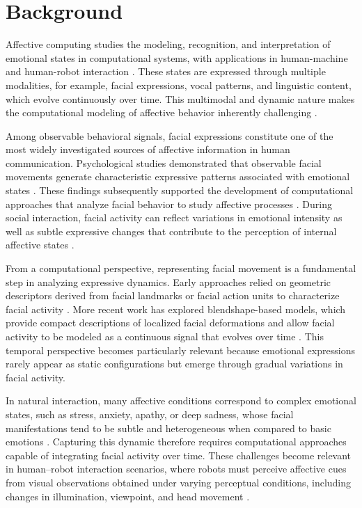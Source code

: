 \documentclass[letterpaper, 10 pt, conference]{ieeeconf}  %
\begin{document}
\section{Background}

Affective computing studies the modeling, recognition, and interpretation of emotional states in computational systems, with applications in human-machine and human-robot interaction \cite{Picard1997, Calvo2010Affective, Afzal2023AffectiveComputing}. These states are expressed through multiple modalities, for example, facial expressions, vocal patterns, and linguistic content, which evolve continuously over time. This multimodal and dynamic nature makes the computational modeling of affective behavior inherently challenging \cite{Zeng2009Survey, Calvo2010Affective}.

Among observable behavioral signals, facial expressions constitute one of the most widely investigated sources of affective information in human communication. Psychological studies demonstrated that observable facial movements generate characteristic expressive patterns associated with emotional states \cite{Ekman1978, Ekman1992}. These findings subsequently supported the development of computational approaches that analyze facial behavior to study affective processes \cite{Pantic2007, Zeng2009Survey, Calvo2010Affective}. During social interaction, facial activity can reflect variations in emotional intensity as well as subtle expressive changes that contribute to the perception of internal affective states \cite{Scherer2005Emotion}.

From a computational perspective, representing facial movement is a fundamental step in analyzing expressive dynamics. Early approaches relied on geometric descriptors derived from facial landmarks or facial action units to characterize facial activity \cite{Bartlett2006, Fasel2003,Pantic2007}. More recent work has explored blendshape-based models, which provide compact descriptions of localized facial deformations and allow facial activity to be modeled as a continuous signal that evolves over time \cite{Cao2014FaceWarehouse, Li2017RealtimeFace}. This temporal perspective becomes particularly relevant because emotional expressions rarely appear as static configurations but emerge through gradual variations in facial activity.

In natural interaction, many affective conditions correspond to complex emotional states, such as stress, anxiety, apathy, or deep sadness, whose facial manifestations tend to be subtle and heterogeneous when compared to basic emotions \cite{Calvo2010Affective, Scherer2005Emotion}. Capturing this dynamic therefore requires computational approaches capable of integrating facial activity over time. These challenges become relevant in human--robot interaction scenarios, where robots must perceive affective cues from visual observations obtained under varying perceptual conditions, including changes in illumination, viewpoint, and head movement \cite{Castellano2009, Gunes2010Survey}.
\end{document}
